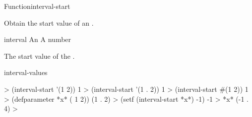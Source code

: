 \documentclass[10pt,twoside,english,pdftex]{article}
\begin{document}
\begin{functiondoc}{Function}{interval-start}%
  { 
    \returns{} }
%
%

\fnsyntax

\fnpurpose Obtain the start value of an .

\fnsetf
{}

\fnpackage {}

\fnmodule {}

\fnargs
\begin{args}{interval}
\arg[interval] An 
 A number
\end{args}

\fnreturns The start value of the .

\begin{alsos}{interval-values}
\end{alsos}

\fnexamples
%
%
\W\supp
\begin{example}
  > (interval-start '(1 2))
  1
  > (interval-start '(1 . 2))
  1
  > (interval-start #(1 2))
  1\goodpagebreak
  > (defparameter *x* ( 1 2))
  (1 . 2)
  > (setf (interval-start *x*) -1)
  -1
  > *x*
  (-1 . 4)
  >
\end{example}

\end{functiondoc}

\end{document}
